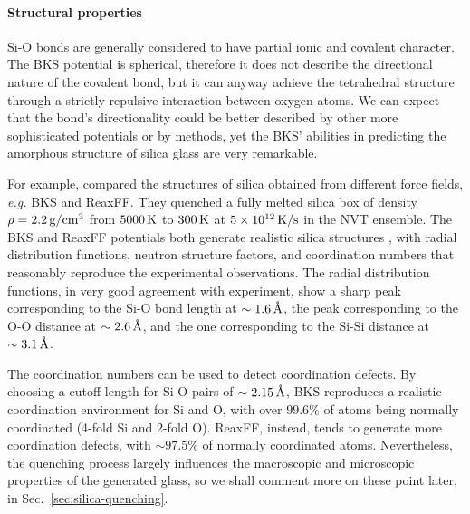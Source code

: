 \paragraph{Structural properties}
Si-O bonds are generally considered to have partial ionic and covalent character. The BKS potential is spherical, therefore it does not describe the directional nature of the covalent bond, but it can anyway achieve the tetrahedral structure through a strictly repulsive interaction between oxygen atoms. We can expect that the bond's directionality could be better described by other more sophisticated potentials or by \abinitio methods, yet the BKS' abilities in predicting the amorphous structure of silica glass are very remarkable. 

For example, \citet{Tian2017} compared the structures of silica obtained from different force fields, \emph{e.g.} BKS and ReaxFF. They quenched a fully melted silica box of density $\rho=2.2\,\mathrm{g/cm^3}$ from $5000\,\mathrm{K}$ to $300\,\mathrm{K}$ at $5\times 10^{12}\,\mathrm{K/s}$ in the NVT ensemble. 
The BKS and ReaxFF potentials both generate realistic silica structures \cite{Vollmayr1996,Yuan2001}, with radial distribution functions, neutron structure factors, and coordination numbers that reasonably reproduce the experimental observations.
The radial distribution functions, in very good agreement with experiment, show a sharp peak corresponding to the Si-O bond length at $\sim 1.6\,\mathrm{{\mbox{\AA}}}$, the peak corresponding to the O-O distance at $\sim 2.6\,\mathrm{{\mbox{\AA}}}$, and the one corresponding to the Si-Si distance at $\sim 3.1\,\mathrm{{\mbox{\AA}}}$. 

The coordination numbers can be used to detect coordination defects. By choosing a cutoff length for Si-O pairs of $\sim 2.15\,\mathrm{{\mbox{\AA}}}$, BKS reproduces a realistic coordination environment for Si and O, with over $99.6\%$ of atoms being normally coordinated (4-fold Si and 2-fold O). ReaxFF, instead, tends to generate more coordination defects, with $\sim 97.5\%$ of normally coordinated atoms.
Nevertheless, the quenching process largely influences the macroscopic and microscopic properties of the generated glass, so we shall comment more on these point later, in Sec.~\ref{sec:silica-quenching}. 


